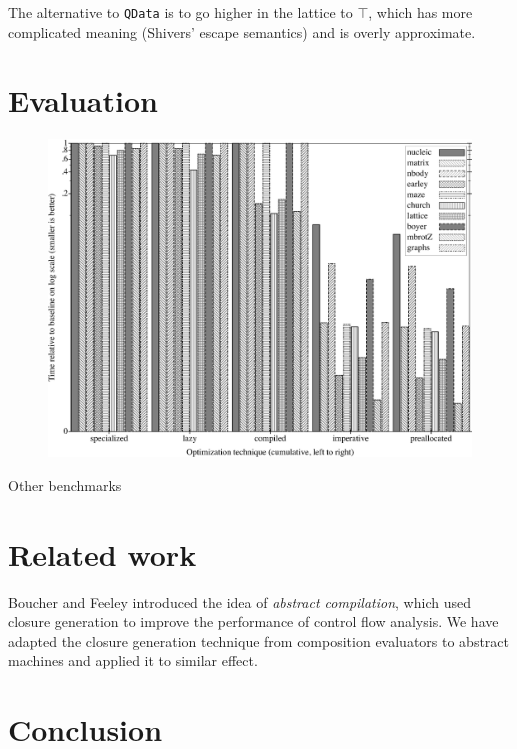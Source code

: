 \documentclass[preprint,onecolumn,9pt]{sigplanconf} %
\begin{document}
The alternative to {\tt QData} is to go higher in the lattice to
$\top$, which has more complicated meaning (Shivers' escape semantics) and
is overly approximate.

\section{Evaluation}


\begin{figure}
\begin{center}
\includegraphics[width=6in]{rel-time.ps}
\end{center}
\end{figure}


\cite{dvanhorn:Earl2012Introspective}

\cite{dvanhorn:wright-jagannathan-toplas98}

Other benchmarks

\section{Related work}

Boucher and Feeley \cite{dvanhorn:Boucher1996Abstract} introduced the
idea of \emph{abstract compilation}, which used closure generation
\cite{dvanhorn:Feeley1987Using} to improve the performance of control
flow analysis.  We have adapted the closure generation technique from
composition evaluators to abstract machines and applied it to similar
effect.

\section{Conclusion}
\end{document}
